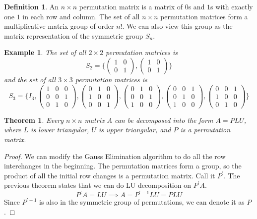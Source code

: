 \documentclass{article}
\newtheorem{theorem}{Theorem}[section]
\newtheorem{example}{Example}[section]
\theoremstyle{remark}
\theoremstyle{definition}
\newtheorem{definition}{Definition}[section]
\begin{document}
\begin{definition}
An $n \times n$ permutation matrix is a matrix of $0$s and $1$s with exactly one $1$ in each row and column. The set of all $n \times n$ permutation matrices form a multiplicative matrix group of order $n!$. We can also view this group as the matrix representation of the symmetric group $S_n$. 
\end{definition}

\begin{example}
The set of all $2 \times 2$ permutation matrices is 
\[S_2 = \bigg\{  \begin{pmatrix}1 & 0 \\0 & 1 \end{pmatrix}, \begin{pmatrix}1 & 0 \\0 & 1 \end{pmatrix} \bigg\}\]
and the set of all $3 \times 3$ permutation matrices is
\[S_3 = \Bigg\{I_3, 
\begin{pmatrix}1 & 0 & 0 \\0 & 0 & 1 \\0 & 1 & 0 \end{pmatrix},
\begin{pmatrix}0 & 1 & 0 \\1 & 0 & 0 \\0 & 0 & 1 \end{pmatrix}, 
\begin{pmatrix}0 & 1 & 0 \\0 & 0 & 1 \\1 & 0 & 0 \end{pmatrix}, 
\begin{pmatrix}0 & 0 & 1 \\0 & 1 & 0 \\1 & 0 & 0 \end{pmatrix}, 
\begin{pmatrix}0 & 0 & 1 \\1 & 0 & 0 \\0 & 1 & 0 \end{pmatrix} \Bigg\} \]
\end{example}

\begin{theorem}
Every $n \times n$ matrix $A$ can be decomposed into the form $A = P L U$, where $L$ is lower triangular, $U$ is upper triangular, and $P$ is a permutation matrix. 
\end{theorem}

\begin{proof}
We can modify the Gauss Elimination algorithm to do all the row interchanges in the beginning. The permutation matrices form a group, so the product of all the initial row changes is a permutation matrix. Call it $P^\prime$. The previous theorem states that we can do LU decomposition on $P^\prime A$. 
\[ P^\prime A = LU \implies A = P^{\prime -1} L U = P L U\]
Since $P^{\prime -1}$ is also in the symmetric group of permutations, we can denote it as $P$. 
\end{proof}
\end{document}
